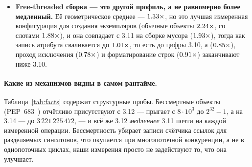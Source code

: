 \begin{itemize}[leftmargin=1.4em,itemsep=1pt]
  \item \textbf{Free-threaded сборка --- это другой профиль, а не равномерно более медленный.} Её
        геометрическое среднее --- $\meas{geomean:b3_runtime-v310|b3_runtime-v314t}{1.33}\times$, но это лучшая измеренная конфигурация для создания
        экземпляров (обычные объекты $\meas{ratio:b3_runtime-v310:create_plain_obj/v310|b3_runtime-v314t:create_plain_obj/v314t}{2.24}\times$, со слотами $\meas{ratio:b3_runtime-v310:create_slots_obj/v310|b3_runtime-v314t:create_slots_obj/v314t}{1.88}\times$), и она совпадает с 3.11
        на сборке мусора ($\meas{ratio:b3_runtime-v310:gc_collect_100k_cycles/v310|b3_runtime-v314t:gc_collect_100k_cycles/v314t}{1.93}\times$), тогда как запись атрибута сваливается до $\meas{ratio:b3_runtime-v310:attr_set/v310|b3_runtime-v314t:attr_set/v314t}{1.01}\times$, то есть
        до цифры 3.10, а  ($\meas{ratio:b3_runtime-v310:list_append/v310|b3_runtime-v314t:list_append/v314t}{0.85}\times$), проход исключения ($\meas{ratio:b3_runtime-v310:exception_roundtrip/v310|b3_runtime-v314t:exception_roundtrip/v314t}{0.78}\times$) и
        форматирование строк ($\meas{ratio:b3_runtime-v310:str_format_join/v310|b3_runtime-v314t:str_format_join/v314t}{0.91}\times$) заканчивают ниже 3.10.
\end{itemize}

\paragraph{Какие из механизмов видны в самом рантайме.}
Таблица~\ref{tab:facts} содержит структурные пробы. Бессмертные объекты (PEP~683~\cite{pep683}) отчётливо
присутствуют с 3.12 ---  прыгает с $8\cdot10^3$ до $2^{32}{-}1$, а на
3.14 --- до $3\,221\,225\,472$, --- и всё же 3.12 \emph{медленнее} 3.11 почти на каждой измеренной
операции. Бессмертность убирает записи счётчика ссылок для разделяемых синглтонов, что окупается
при многопоточной конкуренции, а не в однопоточных циклах, наши измерения просто не задействуют
то, что она улучшает.

